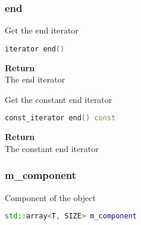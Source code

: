 \subsubsection{end}
\begin{mdframed}
Get the end iterator
\begin{lstlisting}[language=C++]
iterator end()
\end{lstlisting}
\textbf{Return} \\ 
The end iterator\\ 
\end{mdframed}

\begin{mdframed}
Get the constant end iterator
\begin{lstlisting}[language=C++]
const_iterator end() const
\end{lstlisting}
\textbf{Return} \\ 
The constant end iterator\\ 
\end{mdframed}

\subsubsection{m\_component}
\begin{mdframed}
Component of the object
\begin{lstlisting}[language=C++]
std::array<T, SIZE> m_component
\end{lstlisting}
\end{mdframed}

